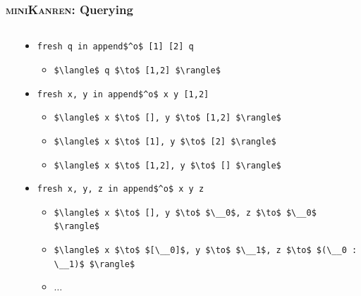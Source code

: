 \documentclass[xcolor=table]{beamer}
\newcommand{\mk}{\textsc{miniKanren}\xspace}
\begin{document}
\begin{frame}[fragile]
  \frametitle{\mk: Querying}
  \begin{columns}
    \begin{column}{0.4\textwidth}
      \begin{center}
        
      \end{center}
    \end{column}
    \begin{column}{0.6\textwidth}
      \begin{itemize}
        \item \lstinline{fresh q in append$^o$ [1] [2] q}
        \begin{itemize}
          \setlength{\itemindent}{-0.6em}
          \item \lstinline{$\langle$ q $\to$ [1,2] $\rangle$}
        \end{itemize}
        \item \lstinline{fresh x, y in append$^o$ x y [1,2]}
        \begin{itemize}
          \setlength{\itemindent}{-0.6em}
          \item \lstinline{$\langle$ x $\to$ [], y $\to$ [1,2] $\rangle$}
          \item \lstinline{$\langle$ x $\to$ [1], y $\to$ [2] $\rangle$}
          \item \lstinline{$\langle$ x $\to$ [1,2], y $\to$ [] $\rangle$}
        \end{itemize}
        \item \lstinline{fresh x, y, z in append$^o$ x y z}
        \begin{itemize}
          \setlength{\itemindent}{-0.6em}
          \item \lstinline{$\langle$ x $\to$ [], y $\to$ $\__0$, z $\to$ $\__0$ $\rangle$}
          \item \lstinline{$\langle$ x $\to$ $[\__0]$, y $\to$ $\__1$, z $\to$ $(\__0 : \__1)$ $\rangle$}
          \item $\dots$
        \end{itemize}
      \end{itemize}
    \end{column}
  \end{columns}

\end{frame}
\end{document}
